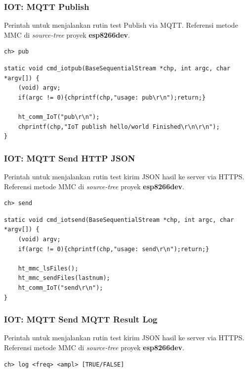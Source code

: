 \documentclass[12pt,]{article}
\begin{document}
	\subsubsection{IOT: MQTT Publish}
	Perintah untuk menjalankan rutin test Publish via MQTT.
	Referensi metode MMC di \textit{source-tree} proyek \textbf{esp8266dev}.
	\begin{verbatim}
ch> pub
	\end{verbatim}
	
	\begin{verbatim}
static void cmd_iotpub(BaseSequentialStream *chp, int argc, char *argv[]) {
	(void) argv;
	if(argc != 0){chprintf(chp,"usage: pub\r\n");return;}
	
	ht_comm_IoT("pub\r\n");
	chprintf(chp,"IoT publish hello/world Finished\r\n\r\n");
}
	\end{verbatim}
	
	\subsubsection{IOT: MQTT Send HTTP JSON}
	Perintah untuk menjalankan rutin test kirim JSON hasil ke server via HTTPS.
	Referensi metode MMC di \textit{source-tree} proyek \textbf{esp8266dev}.
	\begin{verbatim}
ch> send
	\end{verbatim}
	
	\begin{verbatim}
static void cmd_iotsend(BaseSequentialStream *chp, int argc, char *argv[]) {
	(void) argv;
	if(argc != 0){chprintf(chp,"usage: send\r\n");return;}
	
	ht_mmc_lsFiles();
	ht_mmc_sendFiles(lastnum);
	ht_comm_IoT("send\r\n");
}
	\end{verbatim}
	
	\subsubsection{IOT: MQTT Send MQTT Result Log}
	Perintah untuk menjalankan rutin test kirim JSON hasil ke server via HTTPS.
	Referensi metode MMC di \textit{source-tree} proyek \textbf{esp8266dev}.
	\begin{verbatim}
ch> log <freq> <ampl> [TRUE/FALSE]
	\end{verbatim}
	
\end{document}
